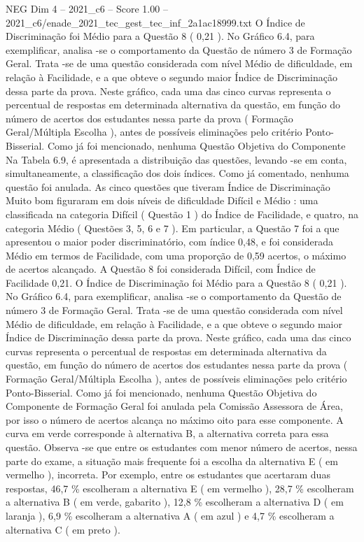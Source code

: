 \begin{textsample}{NEG Dim 4 – 2021\_c6 – Score 1.00 – 2021\_c6/enade\_2021\_tec\_gest\_tec\_inf\_2a1ac18999.txt}
O Índice de Discriminação foi Médio para a Questão 8 ( 0,21 ).
No Gráfico 6.4, para exemplificar, analisa -se o comportamento da Questão de número 3 de Formação Geral.
Trata -se de uma questão considerada com nível Médio de dificuldade, em relação à Facilidade, e a que obteve o segundo maior Índice de Discriminação dessa parte da prova.
Neste gráfico, cada uma das cinco curvas representa o percentual de respostas em determinada alternativa da questão, em função do número de acertos dos estudantes nessa parte da prova ( Formação Geral/Múltipla Escolha ), antes de possíveis eliminações pelo critério Ponto-Bisserial.
Como já foi mencionado, nenhuma Questão Objetiva do Componente Na Tabela 6.9, é apresentada a distribuição das questões, levando -se em conta, simultaneamente, a classificação dos dois índices.
Como já comentado, nenhuma questão foi anulada.
As cinco questões que tiveram Índice de Discriminação Muito bom figuraram em dois níveis de dificuldade Difícil e Médio : uma classificada na categoria Difícil ( Questão 1 ) do Índice de Facilidade, e quatro, na categoria Médio ( Questões 3, 5, 6 e 7 ).
Em particular, a Questão 7 foi a que apresentou o maior poder discriminatório, com índice 0,48, e foi considerada Médio em termos de Facilidade, com uma proporção de 0,59 acertos, o máximo de acertos alcançado.
A Questão 8 foi considerada Difícil, com Índice de Facilidade 0,21.
O Índice de Discriminação foi Médio para a Questão 8 ( 0,21 ).
No Gráfico 6.4, para exemplificar, analisa -se o comportamento da Questão de número 3 de Formação Geral.
Trata -se de uma questão considerada com nível Médio de dificuldade, em relação à Facilidade, e a que obteve o segundo maior Índice de Discriminação dessa parte da prova.
Neste gráfico, cada uma das cinco curvas representa o percentual de respostas em determinada alternativa da questão, em função do número de acertos dos estudantes nessa parte da prova ( Formação Geral/Múltipla Escolha ), antes de possíveis eliminações pelo critério Ponto-Bisserial.
Como já foi mencionado, nenhuma Questão Objetiva do Componente de Formação Geral foi anulada pela Comissão Assessora de Área, por isso o número de acertos alcança no máximo oito para esse componente.
A curva em verde corresponde à alternativa B, a alternativa correta para essa questão.
Observa -se que entre os estudantes com menor número de acertos, nessa parte do exame, a situação mais frequente foi a escolha da alternativa E ( em vermelho ), incorreta.
Por exemplo, entre os estudantes que acertaram duas respostas, 46,7 \% escolheram a alternativa E ( em vermelho ), 28,7 \% escolheram a alternativa B ( em verde, gabarito ), 12,8 \% escolheram a alternativa D ( em laranja ), 6,9 \% escolheram a alternativa A ( em azul ) e 4,7 \% escolheram a alternativa C ( em preto ).

\end{textsample}
